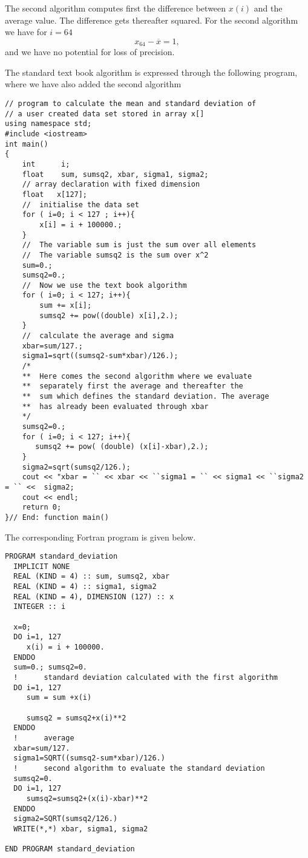 The second algorithm computes first the difference between $x(i)$ and
the average value. The difference gets thereafter squared. 
For the second algorithm we have for $i=64$
\[
   x_{64}-\overline{x}=1,
\]
and we have no potential for loss of precision.


The standard text book algorithm is expressed through the following
program, where we have also added the second algorithm
\lstset{language=c++}
\begin{lstlisting}[title={\url{http://folk.uio.no/mhjensen/compphys/programs/chapter02/cpp/program6.cpp}}]
// program to calculate the mean and standard deviation of
// a user created data set stored in array x[]
using namespace std;
#include <iostream>
int main()
{
    int      i;
    float    sum, sumsq2, xbar, sigma1, sigma2;
    // array declaration with fixed dimension
    float   x[127];
    //  initialise the data set   
    for ( i=0; i < 127 ; i++){
        x[i] = i + 100000.;
    }
    //  The variable sum is just the sum over all elements  
    //  The variable sumsq2 is the sum over x^2    
    sum=0.; 
    sumsq2=0.;
    //  Now we use the text book algorithm 
    for ( i=0; i < 127; i++){
        sum += x[i];
        sumsq2 += pow((double) x[i],2.);
    }
    //  calculate the average and sigma              
    xbar=sum/127.;
    sigma1=sqrt((sumsq2-sum*xbar)/126.);
    /*
    **  Here comes the second algorithm where we evaluate 
    **  separately first the average and thereafter the   
    **  sum which defines the standard deviation. The average 
    **  has already been evaluated through xbar          
    */
    sumsq2=0.;
    for ( i=0; i < 127; i++){
       sumsq2 += pow( (double) (x[i]-xbar),2.);
    }
    sigma2=sqrt(sumsq2/126.);
    cout << "xbar = `` << xbar << ``sigma1 = `` << sigma1 << ``sigma2 = `` <<  sigma2;
    cout << endl;
    return 0;
}// End: function main() 
\end{lstlisting}
The corresponding Fortran  program is given below.
\lstset{language=[90]Fortran}
\begin{lstlisting}[title={\url{http://folk.uio.no/mhjensen/compphys/programs/chapter02/Fortran/program6.f90}}]
PROGRAM standard_deviation
  IMPLICIT NONE
  REAL (KIND = 4) :: sum, sumsq2, xbar
  REAL (KIND = 4) :: sigma1, sigma2
  REAL (KIND = 4), DIMENSION (127) :: x
  INTEGER :: i

  x=0;
  DO i=1, 127
     x(i) = i + 100000.
  ENDDO
  sum=0.; sumsq2=0.
  !      standard deviation calculated with the first algorithm
  DO i=1, 127
     sum = sum +x(i)

     sumsq2 = sumsq2+x(i)**2
  ENDDO
  !      average
  xbar=sum/127.
  sigma1=SQRT((sumsq2-sum*xbar)/126.)
  !      second algorithm to evaluate the standard deviation
  sumsq2=0.
  DO i=1, 127
     sumsq2=sumsq2+(x(i)-xbar)**2
  ENDDO
  sigma2=SQRT(sumsq2/126.)
  WRITE(*,*) xbar, sigma1, sigma2

END PROGRAM standard_deviation
\end{lstlisting}









